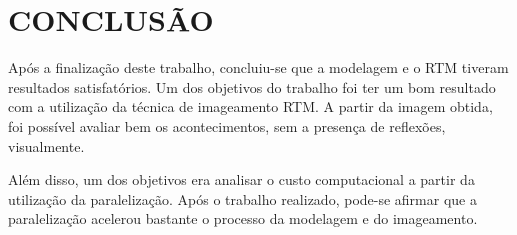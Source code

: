 \chapter{CONCLUSÃO}
\label{cap5}

Após a finalização deste trabalho, concluiu-se que a modelagem e o RTM tiveram resultados satisfatórios. Um dos objetivos do trabalho foi ter um bom resultado com a utilização da técnica de imageamento RTM. A partir da imagem obtida, foi possível avaliar bem os acontecimentos, sem a presença de reflexões, visualmente.

Além disso, um dos objetivos era analisar o custo computacional a partir da utilização da paralelização. Após o trabalho realizado, pode-se afirmar que a paralelização acelerou bastante o processo da modelagem e do imageamento.